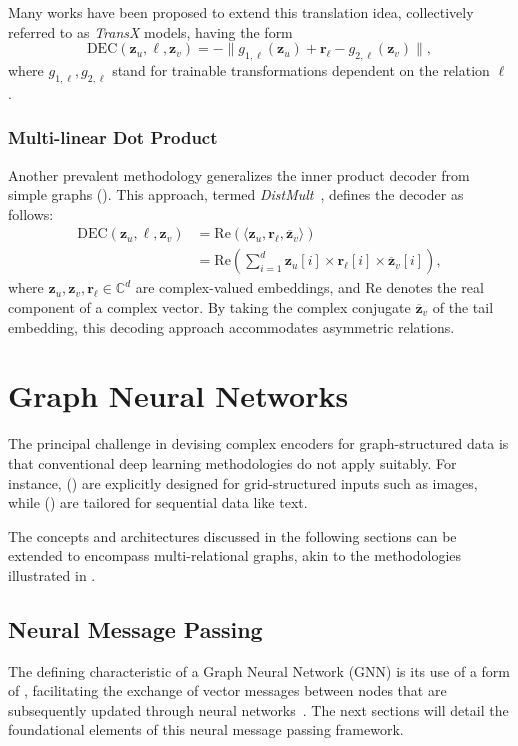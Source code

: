 Many works have been proposed to extend this translation idea, collectively referred to as \textit{TransX} models, having the form
\begin{equation*}
    \text{DEC}(\mathbf{z}_u, \ell, \mathbf{z}_v) = -\|g_{1,\ell}(\mathbf{z}_u) + \mathbf{r}_\ell - g_{2,\ell}(\mathbf{z}_v)\|,
\end{equation*}
where $ g_{1,\ell}, g_{2,\ell} $ stand for trainable transformations dependent on the relation $ \ell $.

\subsubsection{Multi-linear Dot Product}
Another prevalent methodology generalizes the inner product decoder from simple graphs (). This approach, termed \textit{DistMult}~\cite{Yang2014DistMult}, defines the decoder as follows:
\begin{align*}
\text{DEC}(\mathbf{z}_u, \ell, \mathbf{z}_v) &= \text{Re}(\langle \mathbf{z}_u, \mathbf{r}_\ell, \overline{\mathbf{z}}_v\rangle)\\
&= \text{Re}(\sum_{i=1}^d \mathbf{z}_u[i] \times \mathbf{r}_\ell[i] \times \overline{\mathbf{z}}_v[i]),
\end{align*}
where $ \mathbf{z}_u, \mathbf{z}_v, \mathbf{r}_\ell \in \mathbb{C}^d $ are complex-valued embeddings, and $ \text{Re} $ denotes the real component of a complex vector. By taking the complex conjugate $ \overline{\mathbf{z}}_v $ of the tail embedding, this decoding approach accommodates asymmetric relations.

\section{Graph Neural Networks}\label{sec:gnn}
The principal challenge in devising complex encoders for graph-structured data is that conventional deep learning methodologies do not apply suitably. For instance,  () are explicitly designed for grid-structured inputs such as images, while  () are tailored for sequential data like text.

The concepts and architectures discussed in the following sections can be extended to encompass multi-relational graphs, akin to the methodologies illustrated in .

\subsection{Neural Message Passing}
The defining characteristic of a Graph Neural Network (GNN) is its use of a form of , facilitating the exchange of vector messages between nodes that are subsequently updated through neural networks~\cite{Gilmer2017neuralMessagePassing}. The next sections will detail the foundational elements of this neural message passing framework.

